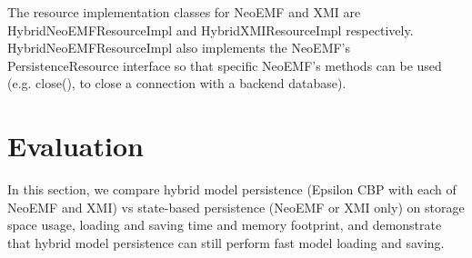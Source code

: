 \documentclass{llncs}
\begin{document}
The resource implementation classes for NeoEMF and XMI are \textsf{HybridNeoEMFResourceImpl} and \textsf{HybridXMIResourceImpl} respectively. \textsf{HybridNeoEMFResourceImpl} also implements the NeoEMF's \textsf{PersistenceResource} interface %
so that specific NeoEMF's methods can be used (e.g. \textsf{close}(), to close a connection with a backend database).


%
%

\vspace{-15pt}
\section{Evaluation}
\label{sec:evaluation}

\vspace{-10pt}
In this section, we compare hybrid model persistence (Epsilon CBP with each of NeoEMF and XMI) vs state-based persistence (NeoEMF or XMI only) on storage space usage, loading and saving time and memory footprint, and demonstrate that hybrid model persistence can still perform fast model loading and saving. 
\end{document}
